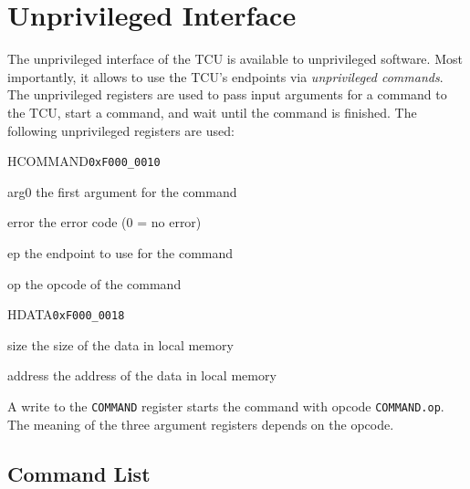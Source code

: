 \chapter{Unprivileged Interface}

The unprivileged interface of the TCU is available to unprivileged software. Most importantly, it
allows to use the TCU's endpoints via \emph{unprivileged commands}. The unprivileged registers are
used to pass input arguments for a command to the TCU, start a command, and wait until the command
is finished. The following unprivileged registers are used:

\begin{register}{H}{COMMAND}{\texttt{0xF000\_0010}}
  \regnewline%
  \begin{regdesc}\begin{reglist}
    \item[arg0] the first argument for the command
    \item[error] the error code (0 = no error)
    \item[ep] the endpoint to use for the command
    \item[op] the opcode of the command
  \end{reglist}\end{regdesc}
\end{register}

\begin{register}{H}{DATA}{\texttt{0xF000\_0018}}
  \regnewline%
  \begin{regdesc}\begin{reglist}
    \item[size] the size of the data in local memory
    \item[address] the address of the data in local memory
  \end{reglist}\end{regdesc}
\end{register}

\noindent A write to the \texttt{COMMAND} register starts the command with opcode
\texttt{COMMAND.op}. The meaning of the three argument registers depends on the opcode.

\section{Command List}

